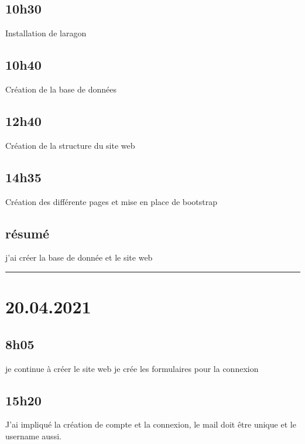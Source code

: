 \documentclass[a4paper,12pt,french]{sphinxmanual}
\begin{document}
\sphinxAtStartPar
{}


\subsection{10h30}
\label{\detokenize{logbook:id3}}
\sphinxAtStartPar
Installation de laragon


\subsection{10h40}
\label{\detokenize{logbook:id4}}
\sphinxAtStartPar
Création de la base de données


\subsection{12h40}
\label{\detokenize{logbook:id5}}
\sphinxAtStartPar
Création de la structure du site web


\subsection{14h35}
\label{\detokenize{logbook:h35}}
\sphinxAtStartPar
Création des différente pages et mise en place de bootstrap


\subsection{résumé}
\label{\detokenize{logbook:resume}}
\sphinxAtStartPar
j’ai créer la base de donnée et le site web


\bigskip\hrule\bigskip



\section{20.04.2021}
\label{\detokenize{logbook:id6}}

\subsection{8h05}
\label{\detokenize{logbook:id7}}
\sphinxAtStartPar
je continue à créer le site web je crée les formulaires pour la connexion


\subsection{15h20}
\label{\detokenize{logbook:id8}}
\sphinxAtStartPar
J’ai impliqué la création de compte et la connexion, le mail doit être unique et le username aussi.
\end{document}
